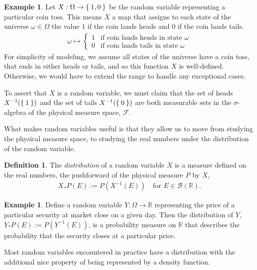 \documentclass[11pt,reqno]{amsart}
\theoremstyle{definition}
\newtheorem{definition}[theorem]{Definition}
\newtheorem{example}[theorem]{Example}
\theoremstyle{remark}
\begin{document}
\begin{example}
	Let \( X : \Omega \rightarrow \Set{1,0} \) be the random variable representing a particular coin toss. This means \(X\)  a map that assigns to each state of the universe \( \omega \in \Omega \) the value \(1\) if the coin lands heads and \(0\) if the coin lands tails.
	\begin{align*}
		\omega \mapsto \begin{cases}
			               1 & \text{if coin lands heads in state } \omega \\
			               0 & \text{if coin lands tails in state } \omega
		               \end{cases}
	\end{align*}
	For simplicity of modeling, we assume all states of the universe have a coin toss, that ends in either heads or tails, and so this function \(X\) is well-defined.
	Otherwise, we would have to extend the range to handle any exceptional cases.

	To assert that \(X\) is a random variable, we must claim that the set of heads \(X^{-1}(\Set{1})\) and the set of tails \(X^{-1}(\Set{0})\) are both measurable sets in the \(\sigma\)-algebra of the physical measure space, \(\mathcal{F}\).
\end{example}

What makes random variables useful is that they allow us to move from studying the physical measure space, to studying the real numbers under the distribution of the random variable.

\begin{definition}
	The \emph{distribution} of a random variable \(X\) is a measure defined on the real numbers, the pushforward of the physical measure \(P\) by \(X\),
	\begin{align*}
		X_{*}P (E) := P \left( X^{-1}(E) \right) \quad \text{for } E \in \mathcal{B}(\mathbb{R}).
	\end{align*}
\end{definition}

\begin{example}
	Define a random variable \(Y: \Omega \rightarrow \mathbb{R}\) representing the price of a particular security at market close on a given day.
	Then the distribution of \(Y\), \(Y_{*}P (E) := P \left( Y^{-1}(E) \right)\), is a probability measure on \(\mathbb{R}\) that describes the probability that the security closes at a particular price.
\end{example}

Most random variables encountered in practice have a distribution with the additional nice property of being represented by a density function.
\end{document}
